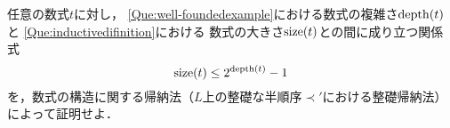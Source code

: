 \begin{Que} \label{Que:structuralinductionexample}
	任意の数式\(t\)に対し，
	\cref{Que:well-foundedexample}における数式の複雑さ\(\apply{\depth}{t}\)と
	\cref{Que:inductivedifinition}における
	数式の大きさ\(\apply{\size}{t}\)との間に成り立つ関係式
	\begin{equation}
		\apply{\size}{t} \leq 2^{\apply{\depth}{t}} - 1
		\label{eq:sizedepthinequality}
	\end{equation}
	を，数式の構造に関する帰納法（\(L\)上の整礎な半順序\(\prec'\)における整礎帰納法）によって証明せよ．
\end{Que}